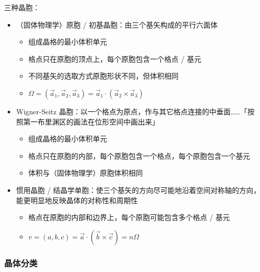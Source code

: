 三种晶胞：\begin{itemize}
    \item （固体物理学）原胞 / 初基晶胞：由三个基矢构成的平行六面体 \begin{itemize}
              \item 组成晶格的最小体积单元
              \item 格点只在原胞的顶点上，每个原胞包含一个格点 / 基元
              \item 不同基矢的选取方式原胞形状不同，但体积相同
              \item $\Omega = (\vec{a}_1, \vec{a}_2, \vec{a}_3) = \vec{a}_1 \cdot (\vec{a}_2 \times \vec{a}_3)$
          \end{itemize}
    \item Wigner-Seitz 晶胞：以一个格点为原点，作与其它格点连接的中垂面……「按照第一布里渊区的画法在位形空间中画出来」 \begin{itemize}
              \item 组成晶格的最小体积单元
              \item 格点只在原胞的内部，每个原胞包含一个格点，每个原胞包含一个基元
              \item 体积与（固体物理学）原胞体积相同
          \end{itemize}
    \item 惯用晶胞 / 结晶学单胞：使三个基矢的方向尽可能地沿着空间对称轴的方向，能更明显地反映晶体的对称性和周期性 \begin{itemize}
              \item 格点在原胞的内部和边界上，每个原胞可能包含多个格点 / 基元
              \item $v = (a, b, c) = \vec{a} \cdot (\vec{b} \times \vec{c}) = n \Omega$
          \end{itemize}
\end{itemize}

\subsubsection{晶体分类}

